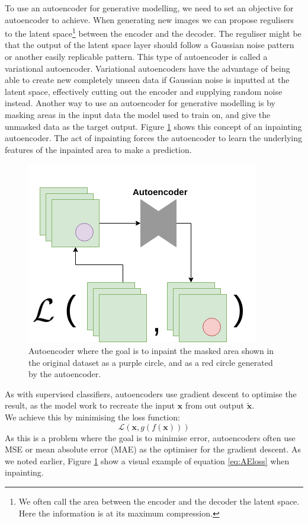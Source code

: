 To use an autoencoder for generative modelling, we need to set an objective for autoencoder to achieve.
When generating new images we can propose regulisers to the latent space\footnote{We often call the area between the encoder and the decoder the latent space. Here the information is at its maximum compression.} between the encoder and the decoder. The reguliser might be that the output of the latent space layer should follow a Gaussian noise pattern or another easily replicable pattern. 
This type of autoencoder is called a variational autoencoder. Variational autoencoders have the advantage of being able to create new completely unseen data if Gaussian noise is inputted at the latent space, effectively cutting out the encoder and supplying random noise instead.
Another way to use an autoencoder for generative modelling is by masking areas in the input data the model used to train on, and give the unmasked data as the target output.
Figure \ref{fig:AEinpainting} shows this concept of an inpainting autoencoder. The act of inpainting forces the autoencoder to learn the underlying features of the inpainted area to make a prediction. 

\begin{figure}[t]
    \centering
    \includegraphics[scale=0.6]{background/figures/AE_for_inpainting.png}
    \caption{Autoencoder where the goal is to inpaint the masked area shown in the original dataset as a purple circle, and as a red circle generated by the autoencoder.}
    \label{fig:AEinpainting}
\end{figure}


As with supervised classifiers, autoencoders use gradient descent to optimise the result, as the model work to recreate the input $\textbf{x}$ from out output $\widetilde{\textbf{x}}$. \\    
We achieve this by minimising the loss function:\\
\begin{equation}
    \mathcal{L}(\textbf{x},g(f(\textbf{x})))
    \label{eq:AEloss}
\end{equation}
As this is a problem where the goal is to minimise error, autoencoders often use MSE or mean absolute error (MAE) as the optimiser for the gradient descent. 
As we noted earlier, Figure \ref{fig:AEinpainting} show a visual example of equation \ref{eq:AEloss} when inpainting.

